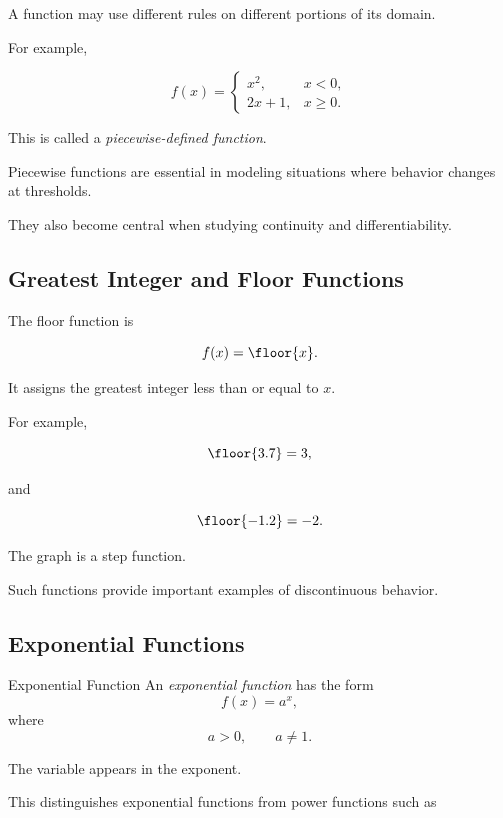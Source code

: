 A function may use different rules on different portions of its domain.

For example,

\[
f(x)=
\begin{cases}
x^2, & x<0,\\
2x+1, & x\geq0.
\end{cases}
\]

This is called a \emph{piecewise-defined function}.

Piecewise functions are essential in modeling situations where behavior
changes at thresholds.

They also become central when studying continuity and differentiability.

\subsection{Greatest Integer and Floor Functions}
\label{subsec:floor-function}

The floor function is

\[ f(x)=\floor{x}. \]

It assigns the greatest integer less than or equal to \(x\).

For example,

\[ \floor{3.7}=3, \]

and

\[ \floor{-1.2}=-2. \]

The graph is a step function.

Such functions provide important examples of discontinuous behavior.

\subsection{Exponential Functions}
\label{subsec:exponential-functions-analysis}

\begin{definitionbox}{Exponential Function}
An \emph{exponential function} has the form
\[ f(x)=a^x, \]
where
\[ a>0,\qquad a\neq1. \]
\end{definitionbox}

The variable appears in the exponent.

This distinguishes exponential functions from power functions such as

